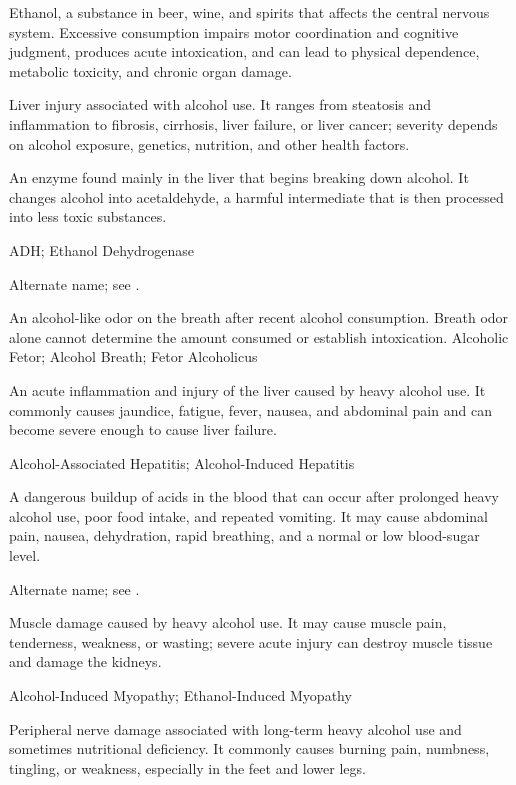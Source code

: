  Ethanol, a substance in beer, wine, and spirits that affects the central nervous system. Excessive consumption impairs motor coordination and cognitive judgment, produces acute intoxication, and can lead to physical dependence, metabolic toxicity, and chronic organ damage.

 Liver injury associated with alcohol use. It ranges from steatosis and inflammation to fibrosis, cirrhosis, liver failure, or liver cancer; severity depends on alcohol exposure, genetics, nutrition, and other health factors.

 An enzyme found mainly in the liver that begins breaking down alcohol. It changes alcohol into acetaldehyde, a harmful intermediate that is then processed into less toxic substances.

\synonyms
ADH; Ethanol Dehydrogenase

 Alternate name; see .

 An alcohol-like odor on the breath after recent alcohol consumption. Breath odor alone cannot determine the amount consumed or establish intoxication.
\synonyms
Alcoholic Fetor; Alcohol Breath; Fetor Alcoholicus

 An acute inflammation and injury of the liver caused by heavy alcohol use. It commonly causes jaundice, fatigue, fever, nausea, and abdominal pain and can become severe enough to cause liver failure.

\synonyms
Alcohol-Associated Hepatitis; Alcohol-Induced Hepatitis

 A dangerous buildup of acids in the blood that can occur after prolonged heavy alcohol use, poor food intake, and repeated vomiting. It may cause abdominal pain, nausea, dehydration, rapid breathing, and a normal or low blood-sugar level.

 Alternate name; see .

 Muscle damage caused by heavy alcohol use. It may cause muscle pain, tenderness, weakness, or wasting; severe acute injury can destroy muscle tissue and damage the kidneys.

\synonyms
Alcohol-Induced Myopathy; Ethanol-Induced Myopathy

 Peripheral nerve damage associated with long-term heavy alcohol use and sometimes nutritional deficiency. It commonly causes burning pain, numbness, tingling, or weakness, especially in the feet and lower legs.

